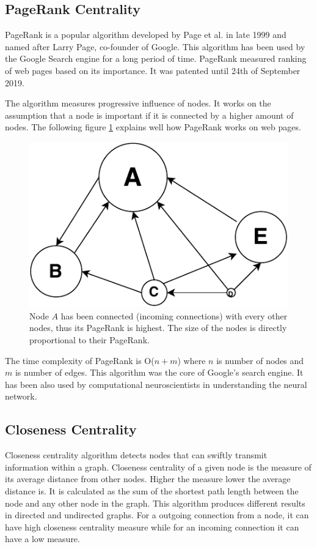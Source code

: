 \documentclass[journal,twoside,web]{ieeecolor}
\begin{document}
\subsection{PageRank Centrality}
PageRank is a popular algorithm developed by Page et al. in late 1999 and named after Larry Page, co-founder of Google. This algorithm has been used by the Google Search engine for a long period of time. PageRank measured ranking of web pages based on its importance. It was patented until 24th of September 2019.

The algorithm measures progressive influence of nodes. It works on the assumption that a node is important if it is connected by a higher amount of nodes. The following figure \ref{fig13} explains well how PageRank works on web pages.

\begin{figure}[!h]
    \centerline{\includegraphics[scale=0.8]{figures/pagerank.pdf}}
    \caption{Node $A$ has been connected (incoming connections) with every other nodes, thus its PageRank is highest. The size of the nodes is directly proportional to their PageRank.}
    \label{fig13}
\end{figure}

The time complexity of PageRank is O($n + m$) where $n$ is number of nodes and $m$ is number of edges. This algorithm was the core of Google's search engine. It has been also used by computational neuroscientists in understanding the neural network.

\subsection{Closeness Centrality}
Closeness centrality algorithm detects nodes that can swiftly transmit information within a graph. Closeness centrality of a given node is the measure of its average distance from other nodes. Higher the measure lower the average distance is. It is calculated as the sum of the shortest path length between the node and any other node in the graph. This algorithm produces different results in directed and undirected graphs. For a outgoing connection from a node, it can have high closeness centrality measure while for an incoming connection it can have a low measure.
\end{document}
